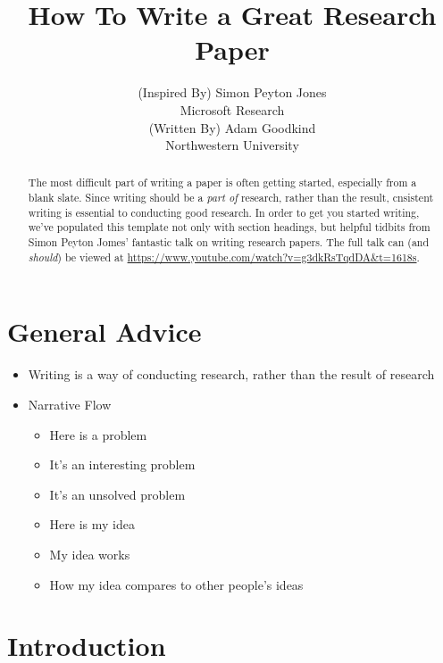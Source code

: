 \documentclass[11pt,a4paper]{article}
\title{How To Write a Great Research Paper}
\author{(Inspired By) Simon Peyton Jones \\
  Microsoft Research \\
  \And
  (Written By) Adam Goodkind \\
  Northwestern University \\
  }
\date{}
\begin{document}
\maketitle
\begin{abstract}
 The most difficult part of writing a paper is often getting started, especially from a blank slate. Since writing should be a \textit{part of} research, rather than the result, cnsistent writing is essential to conducting good research. In order to get you started writing, we've populated this template not only with section headings, but helpful tidbits from Simon Peyton Jomes' fantastic talk on writing research papers. The full talk can (and \textit{should}) be viewed at \url{https://www.youtube.com/watch?v=g3dkRsTqdDA&t=1618s}.
\end{abstract}

\section{General Advice}
\begin{itemize}
\item Writing is a way of conducting research, rather than the result of research
\item Narrative Flow
    \begin{itemize}
    \item Here is a problem
    \item  It's an interesting problem
    \item It's an unsolved problem
    \item Here is my idea
    \item My idea works
    \item How my idea compares to other people's ideas
    \end{itemize}
\end{itemize}

\section{Introduction}
\end{document}
